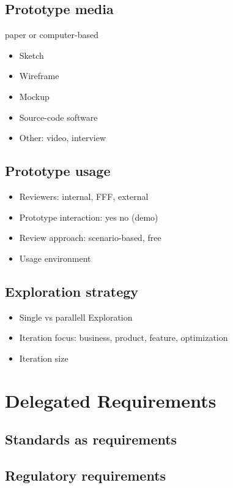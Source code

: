 \documentclass{reqengbook}
\begin{document}
\section{Prototype media}
paper or computer-based
\begin{itemize}
  \item Sketch 
  \item Wireframe
  \item Mockup
  \item Source-code software
  \item Other: video, interview
\end{itemize}

\section{Prototype usage}
\begin{itemize}
  \item Reviewers: internal, FFF, external
  \item Prototype interaction: yes no (demo)
  \item Review approach: scenario-based, free
  \item Usage environment
\end{itemize}

\section{Exploration strategy}
\begin{itemize}
  \item Single vs parallell Exploration
  \item Iteration focus: business, product, feature, optimization
  \item Iteration size
\end{itemize}


\chapter{Delegated Requirements}

\section{Standards as requirements}

\section{Regulatory requirements}
\end{document}
